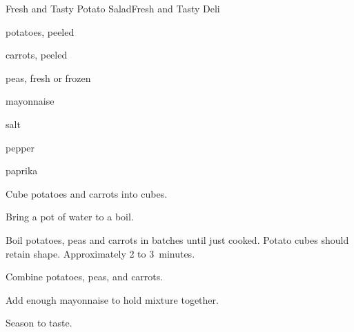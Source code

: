 \begin{recipe}{Fresh and Tasty Potato Salad}{Fresh and Tasty Deli}{}

\begin{ingredients}
\item potatoes, peeled
\item carrots, peeled
\item peas, fresh or frozen
\item mayonnaise
\item salt
\item pepper
\item paprika
\end{ingredients}

\begin{directions}
\item Cube potatoes and carrots into \inch{\half} cubes.
\item Bring a pot of water to a boil.
\item Boil potatoes, peas and carrots in batches until just cooked. Potato cubes should retain shape. Approximately 2 to 3~minutes.
\item Combine potatoes, peas, and carrots.
\item Add enough mayonnaise to hold mixture together.
\item Season to taste.
\end{directions}

\end{recipe}
